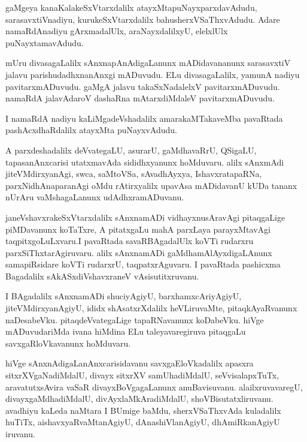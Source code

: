 \documentclass{article}
\begin{document}
\begin{mn}
gaMgeya kanaKalakeSxVtarxdalilx atayxMtapuNayxparxdavAdudu,
sarasavxtiVnadiyu, kurukeSxVtarxdalilx bahusherxVSaThxvAdudu. Adare namaRdAnadiyu gArxmadalUlx,
araNayxdalilxyU, elelxlUlx puNayxtamavAdudu. 
\end{mn}

\begin{mn}
mUru divasagaLalilx sAnxnapAnAdigaLanunx mADidavananunx sarasavxtiV jalavu parishudadhxnanAnxgi 
mADuvudu. ELu divasagaLalilx, yamunA nadiyu pavitarxmADuvudu. gaMgA jalavu takaSxNadalelxV 
pavitarxmADuvudu. namaRdA jalavAdaroV dashaRna mAtarxdiMdaleV pavitarxmADuvudu.
\end{mn}

\begin{mn}
I namaRdA nadiyu kaLiMgadeVshadalilx amarakaMTakaveMba pavaRtada pashAcxdhaRdalilx 
atayxMta puNayxvAdudu.
\end{mn}

\begin{mn}
A parxdeshadalilx deVvategaLU, asurarU, gaMdhavaRrU, QSigaLU, tapasanAnxcarisi utatxmavAda 
sididhxyanunx hoMduvaru. alilx sAnxmAdi jiteVMdirxyanAgi, swca, saMtoVSa, sAvadhAyxya, 
IshavxratapaRNa, parxNidhAnaparanAgi oMdu rAtirxyalilx upavAsa mADidavanU kUDa tananx nUrAru 
vaMshagaLanunx udAdhxramADuvanu.
\end{mn}

\begin{mn}
janeVshavxrakeSxVtarxdalilx sAnxnamADi vidhayxnusAravAgi pitaqgaLige piMDavanunx koTaTxre, A 
pitatxgaLu mahA parxLaya parayxMtavAgi taqpitxgoLuLxvaru.I pavaRtada savaRBAgadalUlx koVTi
rudarxru parxSiThxtarAgiruvaru. alilx sAnxnamADi gaMdhamAlAyxdigaLAnunx samapiRsidare koVTi 
rudarxrU, taqpatxrAguvaru. I pavaRtada pashicxma Bagadalilx sAkASxdiVshavxraneV vAsisutitxruvanu.
\end{mn}

\begin{mn}
I BAgadalilx sAnxnamADi shuciyAgiyU, barxhamxcAriyAgiyU, jiteVMdirxyanAgiyU, ididx 
shAsatxrXdalilx heVLiruvaMte, pitaqkAyaRvanunx naDesabeVku. pitaqdeVvategaLige tapaRNavanunx 
koDabeVku. hiVge mADuvudariMda ivana hiMdina ELu taleyavaregiruva pitaqgaLu savxgaRloVkavanunx 
hoMduvaru.
\end{mn}

\begin{mn}
hiVge sAnxnAdigaLanAnxcarisidavanu savxgaEloVkadalilx apasxra sitxrXVgaNadiMdalU,
divayx sitxrXV samUhadiMdalU, seVvisalapxTuTx, aravatutxsAvira vaSaR divayxBoVgagaLanunx 
anuBavisuvanu. alailxruvavaregU, divayxgaMdhadiMdalU, divAyxlaMkAradiMdalU, shoVBisutatxliruvanu.
avadhiyu kaLeda naMtara I BUmige baMdu, sherxVSaThxvAda kuladalilx huTiTx, aishavxyaRvaMtanAgiyU,
dAnashiVlanAgiyU, dhAmiRkanAgiyU iruvanu.
\end{mn}
\end{document}
